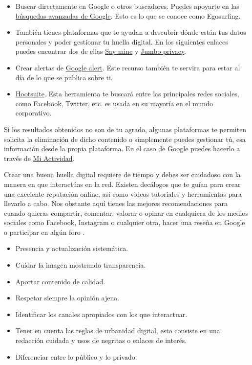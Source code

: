 \documentclass[
  spanish,
  a4paper,
  openany]{book}
\begin{document}
\begin{itemize}
\item
  Buscar directamente en Google o otros buscadores. Puedes apoyarte en las \href{https://support.google.com/websearch/answer/2466433?hl=es}{búsquedas avanzadas de Google}. Esto es lo que se conoce como Egosurfing.
\item
  También tienes plataformas que te ayudan a descubrir dónde están tus datos personales y poder gestionar tu huella digital. En los siguientes enlaces puedes encontrar dos de ellas \href{https://saymine.com/}{Say mine} y \href{https://www.jumboprivacy.com/}{Jumbo privacy}.
\item
  Crear alertas de \href{https://www.google.es/alerts}{Google alert}. Este recurso también te servira para estar al día de lo que se publica sobre ti.
\item
  \href{https://www.hootsuite.com/}{Hootsuite}. Esta herramienta te buscará entre las principales redes sociales, como Facebook, Twitter, etc. es usada en su mayoría en el mundo corporativo.
\end{itemize}

Si los resultados obtenidos no son de tu agrado, algunas plataformas te permiten solicita la eliminación de dicho contenido o simplemente puedes gestionar tú, esa información desde la propia plataforma. En el caso de Google puedes hacerlo a través de \href{https://myactivity.google.com/myactivity}{Mi Actividad}.

Crear una buena huella digital requiere de tiempo y debes ser cuidadoso con la manera en que interactúas en la red. Existen decálogos que te guían para crear una excelente reputación online, así como videos tutoriales y herramientas para llevarlo a cabo. Nos obstante aquí tienes las mejores recomendaciones para cuando quieras compartir, comentar, valorar o opinar en cualquiera de los medios sociales como Facebook, Instagram o cualquier otra, hacer una reseña en Google o participar en algún foro \citep{decalogo-digital}.

\begin{itemize}
\item
  Presencia y actualización sistemática.
\item
  Cuidar la imagen mostrando transparencia.
\item
  Aportar contenido de calidad.
\item
  Respetar siempre la opinión ajena.
\item
  Identificar los canales apropiados con los que interactuar.
\item
  Tener en cuenta las reglas de urbanidad digital, esto consiste en una redacción cuidada y usos de negritas o enlaces de interés.
\item
  Diferenciar entre lo público y lo privado.
\end{itemize}
\end{document}
